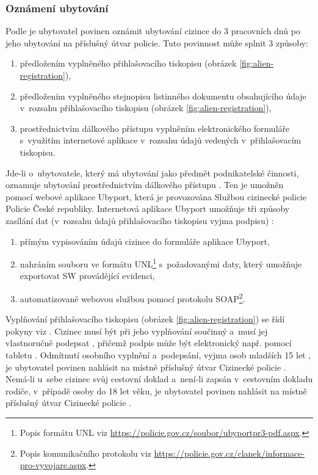 \subsubsection*{Oznámení ubytování}
Podle \cite[\S~102]{cz-1999-326} je ubytovatel povinen oznámit ubytování cizince do 3 pracovních dnů po jeho ubytování na příslušný útvar policie.
Tuto povinnost může splnit 3 způsoby:
\begin{enumerate}
    \item předložením vyplněného přihlašovacího tiskopisu (obrázek \ref{fig:alien-registration}),
    \item předložením vyplněného stejnopisu listinného dokumentu obsahujícího údaje v~rozsahu přihlašovacího tiskopisu (obrázek \ref{fig:alien-registration}),
    \item prostřednictvím dálkového přístupu vyplněním elektronického formuláře s~využitím internetové aplikace v~rozsahu údajů vedených v~přihlašovacím tiskopisu.
\end{enumerate}

\label{sec:ubyport}
Jde-li o~ubytovatele, který má ubytování jako předmět podnikatelské činnosti, oznamuje ubytování prostřednictvím dálkového přístupu \cite[\S~102(3)]{cz-1999-326}.
Ten je umožněn pomocí webové aplikace Ubyport, která je provozována Službou cizinecké policie Policie České republiky.
Internetová aplikace Ubyport umožňuje tři způsoby zasílání dat (v~rozsahu údajů přihlašovacího tiskopisu vyjma podpisu) \cite{www-ubyport-moznosti}:
\begin{enumerate}
    \item přímým vypisováním údajů cizince do formuláře aplikace Ubyport,
    \item nahráním souboru ve formátu UNL\footnote{Popis formátu UNL viz \url{https://policie.gov.cz/soubor/ubyportpr3-pdf.aspx}.} s~požadovanými daty, který umožňuje exportovat SW provádějící evidenci,
    \item automatizovaně webovou službou pomocí protokolu SOAP\footnote{Popis komunikačního protokolu viz \url{https://policie.gov.cz/clanek/informace-pro-vyvojare.aspx}.}.
\end{enumerate}

Vyplňování přihlašovacího tiskopisu (obrázek \ref{fig:alien-registration}) se řídí pokyny viz \cite{www-registrace-pokyny}.
Cizinec musí být při jeho vyplňování součinný a~musí jej vlastnoručně podepsat \cite[\S~103(a)]{cz-1999-326}, přičemž podpis může být elektronický např. pomocí tabletu \cite[bod č. 2]{www-registrace-pokyny}.
Odmítnutí osobního vyplnění a~podepsání, vyjma osob mladších 15 let \cite[\S~103(b)]{cz-1999-326}, je ubytovatel povinen nahlásit na místně příslušný útvar Cizinecké policie \cite[bod č. 3]{www-registrace-pokyny}.
Nemá-li u~sebe cizinec svůj cestovní doklad a~není-li zapsán v~cestovním dokladu rodiče, v~případě osoby do 18 let věku, je ubytovatel povinen nahlásit na místně příslušný útvar Cizinecké policie \cite[bod č. 5]{www-registrace-pokyny}.

